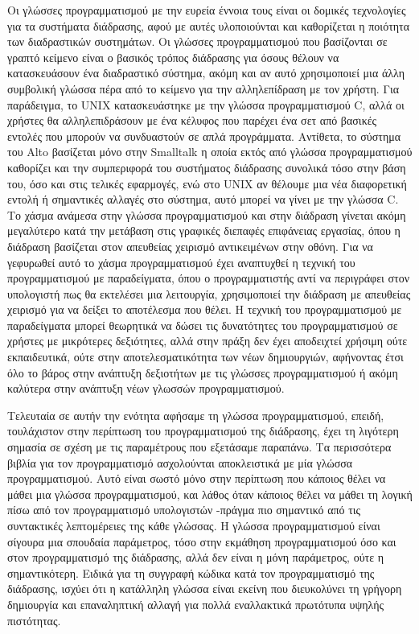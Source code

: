 \documentclass[
]{article}
\begin{document}
Οι γλώσσες προγραμματισμού με την ευρεία έννοια τους είναι οι δομικές
τεχνολογίες για τα συστήματα διάδρασης, αφού με αυτές υλοποιούνται και
καθορίζεται η ποιότητα των διαδραστικών συστημάτων. Οι γλώσσες
προγραμματισμού που βασίζονται σε γραπτό κείμενο είναι ο βασικός τρόπος
διάδρασης για όσους θέλουν να κατασκευάσουν ένα διαδραστικό σύστημα,
ακόμη και αν αυτό χρησιμοποιεί μια άλλη συμβολική γλώσσα πέρα από το
κείμενο για την αλληλεπίδραση με τον χρήστη. Για παράδειγμα, το UNIX
κατασκευάστηκε με την γλώσσα προγραμματισμού C, αλλά οι χρήστες θα
αλληλεπιδράσουν με ένα κέλυφος που παρέχει ένα σετ από βασικές εντολές
που μπορούν να συνδυαστούν σε απλά προγράμματα. Αντίθετα, το σύστημα του
Alto βασίζεται μόνο στην Smalltalk η οποία εκτός από γλώσσα
προγραμματισμού καθορίζει και την συμπεριφορά του συστήματος διάδρασης
συνολικά τόσο στην βάση του, όσο και στις τελικές εφαρμογές, ενώ στο
UNIX αν θέλουμε μια νέα διαφορετική εντολή ή σημαντικές αλλαγές στο
σύστημα, αυτό μπορεί να γίνει με την γλώσσα C. Το χάσμα ανάμεσα στην
γλώσσα προγραμματισμού και στην διάδραση γίνεται ακόμη μεγαλύτερο κατά
την μετάβαση στις γραφικές διεπαφές επιφάνειας εργασίας, όπου η διάδραση
βασίζεται στον απευθείας χειρισμό αντικειμένων στην οθόνη. Για να
γεφυρωθεί αυτό το χάσμα προγραμματισμού έχει αναπτυχθεί η τεχνική του
προγραμματισμού με παραδείγματα, όπου ο προγραμματιστής αντί να
περιγράφει στον υπολογιστή πως θα εκτελέσει μια λειτουργία, χρησιμοποιεί
την διάδραση με απευθείας χειρισμό για να δείξει το αποτέλεσμα που
θέλει. Η τεχνική του προγραμματισμού με παραδείγματα μπορεί θεωρητικά να
δώσει τις δυνατότητες του προγραμματισμού σε χρήστες με μικρότερες
δεξιότητες, αλλά στην πράξη δεν έχει αποδειχτεί χρήσιμη ούτε
εκπαιδευτικά, ούτε στην αποτελεσματικότητα των νέων δημιουργιών,
αφήνοντας έτσι όλο το βάρος στην ανάπτυξη δεξιοτήτων με τις γλώσσες
προγραμματισμού ή ακόμη καλύτερα στην ανάπτυξη νέων γλωσσών
προγραμματισμού.

Τελευταία σε αυτήν την ενότητα αφήσαμε τη γλώσσα προγραμματισμού,
επειδή, τουλάχιστον στην περίπτωση του προγραμματισμού της διάδρασης,
έχει τη λιγότερη σημασία σε σχέση με τις παραμέτρους που εξετάσαμε
παραπάνω. Τα περισσότερα βιβλία για τον προγραμματισμό ασχολούνται
αποκλειστικά με μία γλώσσα προγραμματισμού. Αυτό είναι σωστό μόνο στην
περίπτωση που κάποιος θέλει να μάθει μια γλώσσα προγραμματισμού, και
λάθος όταν κάποιος θέλει να μάθει τη λογική πίσω από τον προγραμματισμό
υπολογιστών -πράγμα πιο σημαντικό από τις συντακτικές λεπτομέρειες της
κάθε γλώσσας. Η γλώσσα προγραμματισμού είναι σίγουρα μια σπουδαία
παράμετρος, τόσο στην εκμάθηση προγραμματισμού όσο και στον
προγραμματισμό της διάδρασης, αλλά δεν είναι η μόνη παράμετρος, ούτε η
σημαντικότερη. Ειδικά για τη συγγραφή κώδικα κατά τον προγραμματισμό της
διάδρασης, ισχύει ότι η κατάλληλη γλώσσα είναι εκείνη που διευκολύνει τη
γρήγορη δημιουργία και επαναληπτική αλλαγή για πολλά εναλλακτικά
πρωτότυπα υψηλής πιστότητας.
\end{document}
